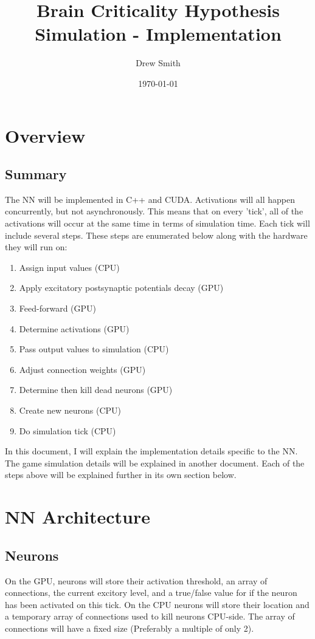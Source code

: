 \documentclass{article} %
\title{Brain Criticality Hypothesis Simulation - Implementation} %
\author{Drew Smith} %
\date{\today} %
\begin{document}
    \maketitle %
    
    \section{Overview}
        \subsection{Summary}
            The NN will be implemented in C++ and CUDA. Activations will all happen concurrently, but not asynchronously. This means that on every 'tick', all of the activations will occur at the same time in terms of simulation time. Each tick will include several steps. These steps are enumerated below along with the hardware they will run on:
            \begin{enumerate}[noitemsep]
                \item Assign input values (CPU)
                \item Apply excitatory postsynaptic potentials decay (GPU)
                \item Feed-forward (GPU)
                \item Determine activations (GPU)
                \item Pass output values to simulation (CPU)
                \item Adjust connection weights (GPU)
                \item Determine then kill dead neurons (GPU)
                \item Create new neurons (CPU)
                \item Do simulation tick (CPU)
            \end{enumerate}

            In this document, I will explain the implementation details specific to the NN. The game simulation details will be explained in another document. Each of the steps above will be explained further in its own section below.
    \section{NN Architecture}
        \subsection{Neurons}
            On the GPU, neurons will store their activation threshold, an array of connections, the current excitory level, and a true/false value for if the neuron has been activated on this tick. On the CPU neurons will store their location and a temporary array of connections used to kill neurons CPU-side. The array of connections will have a fixed size (Preferably a multiple of only 2).
\end{document}
